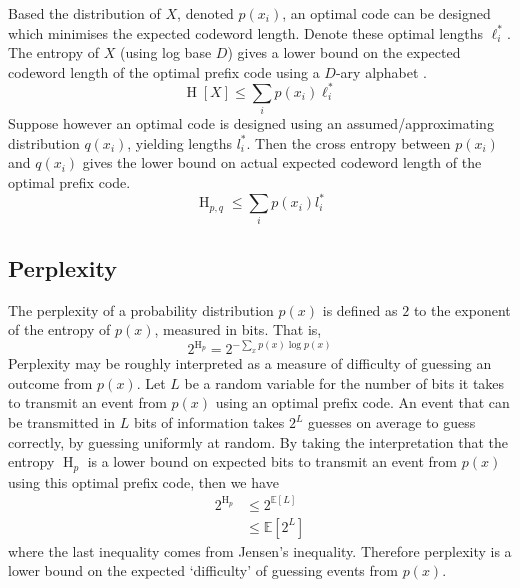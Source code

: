 \documentclass[11pt]{report} %
\begin{document}
Based the distribution of $X$, denoted $p\left(x_{i}\right)$, an optimal code can be designed which minimises the expected codeword length. Denote these optimal lengths $\ell_{i}^{*}$. The entropy of $X$ (using log base $D$) gives a lower bound on the expected codeword length of the optimal prefix code using a $D$-ary alphabet \cite{Cover2006}.
\begin{equation}
\operatorname{H}\left[X\right] \leq \sum_{i}p\left(x_{i}\right)\ell_{i}^{*}
\end{equation}
Suppose however an optimal code is designed using an assumed/approximating distribution $q\left(x_{i}\right)$, yielding lengths $l_{i}^{*}$. Then the cross entropy between $p\left(x_{i}\right)$ and $q\left(x_{i}\right)$ gives the lower bound on actual expected codeword length of the optimal prefix code.
\begin{equation}
\operatorname{H}_{p, q} \leq \sum_{i}p\left(x_{i}\right)l_{i}^{*}
\end{equation}

\subsection{Perplexity}

The perplexity of a probability distribution $p\left(x\right)$ is defined as $2$ to the exponent of the entropy of $p\left(x\right)$, measured in bits. That is,
\begin{equation}
2^{\operatorname{H}_{p}} = 2^{-\sum_{x}p\left(x\right)\log p\left(x\right)}
\end{equation}
Perplexity may be roughly interpreted as a measure of difficulty of guessing an outcome from $p\left(x\right)$. Let $L$ be a random variable for the number of bits it takes to transmit an event from $p\left(x\right)$ using an optimal prefix code. An event that can be transmitted in $L$ bits of information takes $2^{L}$ guesses on average to guess correctly, by guessing uniformly at random.  By taking the interpretation that the entropy $\operatorname{H}_{p}$ is a lower bound on expected bits to transmit an event from $p\left(x\right)$ using this optimal prefix code, then we have
\begin{align}
2^{\operatorname{H}_{p}} &\leq 2^{\mathbb{E}\left[L\right]} \\
&\leq \mathbb{E}\left[2^{L}\right]
\end{align}
where the last inequality comes from Jensen's inequality. Therefore perplexity is a lower bound on the expected `difficulty' of guessing events from $p\left(x\right)$.
\end{document}
